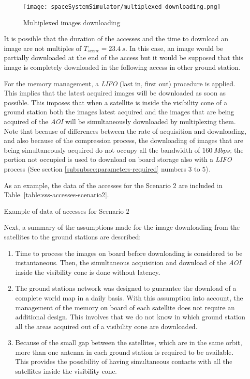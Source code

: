 \begin{figure}[!h]
\begin{center}
\texttt{[image: spaceSystemSimulator/multiplexed-downloading.png]}
\caption{Multiplexed images downloading}
\label{fig:sss-multiplexed-downloading}
\end{center}
\end{figure}



It is possible that the duration of the accesses and the time to download an image are not multiples of $T_{scene}=23.4~s$. In this case, an image would be partially downloaded at the end of the access but it would be supposed that this image is completely downloaded in the following access in other ground station.

For the memory management, a \emph{LIFO} (last in, first out) procedure is
applied. This implies that the latest acquired images will be downloaded as soon
as possible. This imposes that when a satellite is inside the visibility cone of
a ground station both the images latest acquired and the images that are being
acquired of the \emph{AOI} will be simultaneously downloaded by multiplexing
them. Note that because of differences between the rate of acquisition and
downloading, and also because of the compression process, the downloading of
images that are being simultaneously acquired do not occupy all the bandwidth of
$160~Mbps$; the portion not occupied is used to download on board storage also
with a \emph{LIFO} process (See section \ref{subsubsec:parameters-required} numbers 3 to 5).


As an example, the data of the accesses for the Scenario 2 are included in Table~\ref{table:sss-accesses-scenario2}.


\begin{table}[hp]
  \centering
  {\small
  
  }
  \caption{Example of data of accesses for Scenario 2}
  \label{table:sss-accesses-scenario2}
\end{table}


Next, a summary of the assumptions made for the image downloading from the
satellites to the ground stations are described:
\begin{enumerate}
\item Time to process the images on board before downloading is considered to be instantaneous. Then, the simultaneous acquisition and download of the \emph{AOI} inside the visibility cone is done without latency.
\item The ground stations network was designed to guarantee the download of a complete world map in a daily basis. With this assumption into account, the management of the memory on board of each satellite does not require an additional design. This involves that we do not know in which ground station all the areas acquired out of a visibility cone are downloaded.
\item Because of the small gap between the satellites, which are in the same orbit, more than one antenna in each ground station is required to be available. This provides the possibility of having simultaneous contacts with all the satellites inside the visibility cone.
\end{enumerate}

